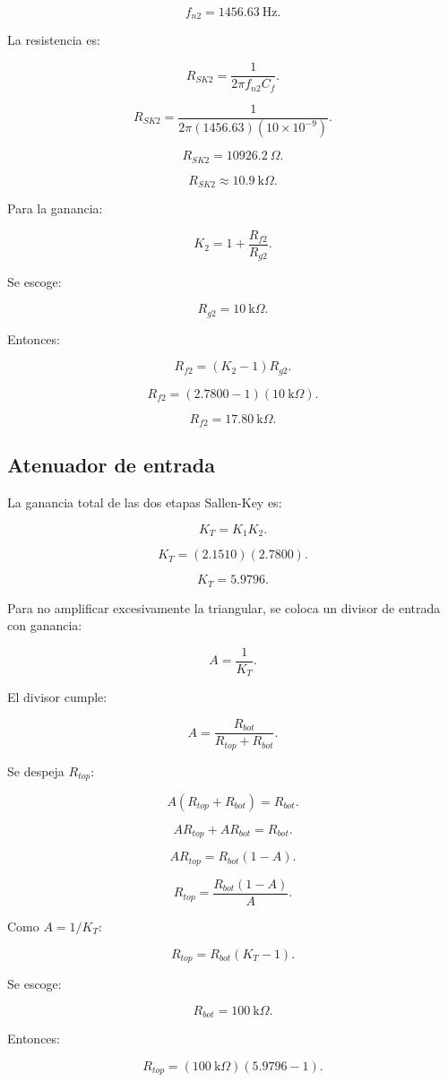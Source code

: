 \documentclass[11pt,letterpaper]{article}
\begin{document}
\[
f_{n2}=1456.63~\text{Hz}.
\]

La resistencia es:

\[
R_{SK2}=
\frac{1}{2\pi f_{n2}C_f}.
\]

\[
R_{SK2}=
\frac{1}
{2\pi(1456.63)(10\times 10^{-9})}.
\]

\[
R_{SK2}=10926.2~\Omega.
\]

\[
\boxed{R_{SK2}\approx 10.9~\text{k}\Omega}.
\]

Para la ganancia:

\[
K_2=1+\frac{R_{f2}}{R_{g2}}.
\]

Se escoge:

\[
R_{g2}=10~\text{k}\Omega.
\]

Entonces:

\[
R_{f2}=(K_2-1)R_{g2}.
\]

\[
R_{f2}=(2.7800-1)(10~\text{k}\Omega).
\]

\[
R_{f2}=17.80~\text{k}\Omega.
\]

\subsection{Atenuador de entrada}

La ganancia total de las dos etapas Sallen-Key es:

\[
K_T=K_1K_2.
\]

\[
K_T=(2.1510)(2.7800).
\]

\[
K_T=5.9796.
\]

Para no amplificar excesivamente la triangular, se coloca un divisor de entrada
con ganancia:

\[
A=\frac{1}{K_T}.
\]

El divisor cumple:

\[
A=\frac{R_{bot}}{R_{top}+R_{bot}}.
\]

Se despeja \(R_{top}\):

\[
A(R_{top}+R_{bot})=R_{bot}.
\]

\[
AR_{top}+AR_{bot}=R_{bot}.
\]

\[
AR_{top}=R_{bot}(1-A).
\]

\[
R_{top}=\frac{R_{bot}(1-A)}{A}.
\]

Como \(A=1/K_T\):

\[
R_{top}=R_{bot}(K_T-1).
\]

Se escoge:

\[
R_{bot}=100~\text{k}\Omega.
\]

Entonces:

\[
R_{top}=(100~\text{k}\Omega)(5.9796-1).
\]
\end{document}
